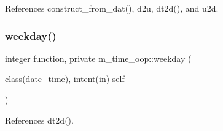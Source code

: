 References construct\+\_\+from\+\_\+dat(), d2u, dt2d(), and u2d.

\mbox{\label{namespacem__time__oop_ad290beea1dd0dc3d34486e8b4cd8a86c}} 
\subsubsection{\texorpdfstring{weekday()}{weekday()}}
{\footnotesize\ttfamily integer function, private m\+\_\+time\+\_\+oop\+::weekday (\begin{DoxyParamCaption}\item[{class(\hyperlink{structm__time__oop_1_1date__time}{date\+\_\+time}), intent(\hyperlink{M__journal_83_8txt_afce72651d1eed785a2132bee863b2f38}{in})}]{self }\end{DoxyParamCaption})\hspace{0.3cm}{\ttfamily [private]}}



References dt2d().

